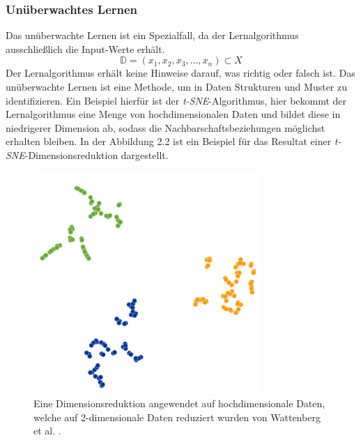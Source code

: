 \documentclass[12pt,letterpaper,ngerman]{article}
\begin{document}
\subsubsection{Unüberwachtes Lernen}
Das unüberwachte Lernen ist ein Spezialfall, da der Lernalgorithmus
ausschließlich die Input-Werte erhält.
\[\mathbb{D} = (x_1, x_2, x_3, \dots, x_n) \subset X\]
Der Lernalgorithmus erhält keine Hinweise darauf, was richtig oder 
falsch ist. Das unüberwachte Lernen ist eine Methode, um in Daten
Strukturen und Muster zu identifizieren. Ein Beispiel hierfür ist der
\textit{t-SNE}-Algorithmus, hier bekommt der Lernalgorithmus eine Menge 
von hochdimensionalen Daten und bildet diese in niedrigerer Dimension
ab, sodass die Nachbarschaftsbeziehungen möglichst erhalten bleiben.
In der Abbildung 2.2 ist ein Beispiel für das Resultat einer 
\textit{t-SNE}-Dimensionsreduktion dargestellt.
\begin{figure}[H]
  \centering
  \includegraphics[scale=0.3]{abb/t-sne-example.png}
  \caption{Eine Dimensionsreduktion angewendet auf 
    hochdimensionale Daten,
    welche auf 2-dimensionale Daten reduziert wurden
    von Wattenberg et al. \cite{wattenberg2016how}.
  }
\end{figure}
\end{document}
